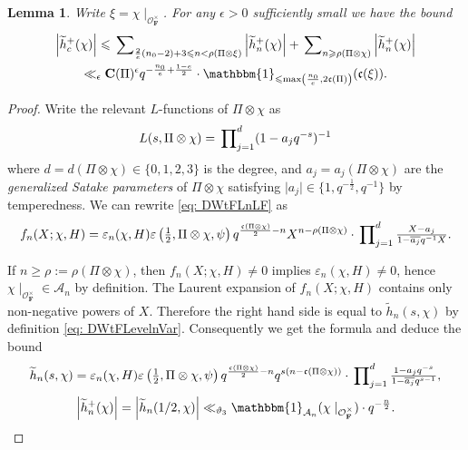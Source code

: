 \documentclass[A4]{amsart}
\def\leq{\leqslant}
\def\geq{\geqslant}
\newtheorem{lemma}      [theorem]{Lemma}
\numberwithin{equation}{section} \everymath{\displaystyle}
\newcommand{\id}{\mathbbm{1}}
\newcommand{\F}{\mathbf{F}}
\newcommand{\vO}{\mathcal{O}}
\newcommand{\norm}[1][\cdot]{\lvert #1 \rvert}
\newcommand{\extnorm}[1]{\left\lvert #1 \right\rvert}
\newcommand{\Cond}{\mathbf{C}}
\newcommand{\cond}{\mathfrak{c}}
\newcommand{\condL}{\mathfrak{\rho}}
\newcommand{\RamCst}{\vartheta}
\begin{document}
\begin{lemma} \label{lem: DWt+Bd}
	Write $\xi = \chi \mid_{\vO_{\F}^{\times}}$. For any $\epsilon > 0$ sufficiently small we have the bound
\begin{multline*}
	\extnorm{\widetilde{h}_c^+(\chi)} \leq \sideset{}{_{\frac{2}{e}(n_0-2)+3 \leq n < \condL(\Pi \otimes \xi)}} \sum \extnorm{\widetilde{h}_n^+(\chi)} + \sideset{}{_{n \geq \condL(\Pi \otimes \chi)}} \sum \extnorm{\widetilde{h}_n^+(\chi)} \\
	\ll_{\epsilon} \Cond(\Pi)^{\epsilon} q^{-\frac{n_0}{e}+\frac{1-e}{2}} \cdot \id_{\leq \max \left( \frac{n_0}{e},2\cond(\Pi) \right)}(\cond(\xi)).
\end{multline*}
\end{lemma}
\begin{proof}
	Write the relevant $L$-functions of $\Pi \otimes \chi$ as
	$$ L(s, \Pi \otimes \chi) = \sideset{}{_{j=1}^d} \prod (1-a_j q^{-s})^{-1} $$
where $d=d(\Pi \otimes \chi) \in \{ 0,1,2,3 \}$ is the degree, and $a_j=a_j(\Pi \otimes \chi)$ are the \emph{generalized Satake parameters} of $\Pi \otimes \chi$ satisfying $\norm[a_j] \in \{ 1, q^{-\frac{1}{2}}, q^{-1} \}$ by temperedness. We can rewrite \eqref{eq: DWtFLnLF} as
\begin{equation} \label{eq: VHTestFLevelnMellin}
	f_n(X; \chi,H) = \varepsilon_n(\chi, H) \varepsilon \left( \tfrac{1}{2}, \Pi \otimes \chi, \psi \right) q^{\frac{\cond(\Pi \otimes \chi)}{2}-n} X^{n-\condL(\Pi \otimes \chi)} \cdot \sideset{}{_{j=1}^d} \prod \tfrac{X-a_j}{1-\overline{a_j}q^{-1}X}. 
\end{equation}
	
\noindent If $n \geq \condL := \condL(\Pi \otimes \chi)$, then $f_n(X; \chi,H) \neq 0$ implies $\varepsilon_n(\chi,H) \neq 0$, hence $\chi \mid_{\vO_{\F}^{\times}} \in \mathcal{A}_n$ by definition. The Laurent expansion of $f_n(X; \chi,H)$ contains only non-negative powers of $X$. Therefore the right hand side is equal to $\widetilde{h}_n(s, \chi)$ by definition \eqref{eq: DWtFLevelnVar}. Consequently we get the formula and deduce the bound
	$$ \widetilde{h}_n(s, \chi) = \varepsilon_n(\chi, H) \varepsilon \left( \tfrac{1}{2}, \Pi \otimes \chi, \psi \right) q^{\frac{\cond(\Pi \otimes \chi)}{2}-n} q^{s(n-\cond(\Pi \otimes \chi))} \cdot \sideset{}{_{j=1}^d} \prod \tfrac{1-a_j q^{-s}}{1-\overline{a_j}q^{s-1}}, $$
\begin{equation} \label{eq: RedBd1}
	\extnorm{\widetilde{h}_n^+(\chi)} = \extnorm{\widetilde{h}_n(1/2, \chi)} \ll_{\RamCst_3} \id_{\mathcal{A}_n}(\chi \mid_{\vO_{\F}^{\times}}) \cdot q^{-\frac{n}{2}}. 
\end{equation}
	

\end{proof}
\end{document}
